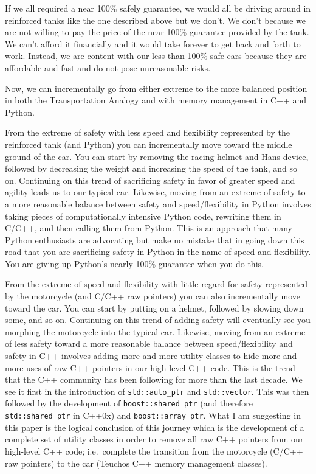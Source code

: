\documentclass[pdf,ps2pdf,11pt]{SANDreport}
\begin{document}
If we all required a near 100\% safely guarantee, we would all be
driving around in reinforced tanks like the one described above but we
don't.  We don't because we are not willing to pay the price of the
near 100\% guarantee provided by the tank.  We can't afford it
financially and it would take forever to get back and forth to
work. Instead, we are content with our less than 100\% safe cars
because they are affordable and fast and do not pose unreasonable
risks.

Now, we can incrementally go from either extreme to the more balanced
position in both the Transportation Analogy and with memory management
in C++ and Python.

From the extreme of safety with less speed and flexibility represented
by the reinforced tank (and Python) you can incrementally move toward
the middle ground of the car. You can start by removing the racing
helmet and Hans device, followed by decreasing the weight and
increasing the speed of the tank, and so on.  Continuing on this trend
of sacrificing safety in favor of greater speed and agility leads us
to our typical car.  Likewise, moving from an extreme of safety to a
more reasonable balance between safety and speed/flexibility in Python
involves taking pieces of computationally intensive Python code,
rewriting them in C/C++, and then calling them from Python.  This is
an approach that many Python enthusiasts are advocating
{}\cite{PythonForSCPerforamnce08} but make no mistake that in going
down this road that you are sacrificing safety in Python in the name
of speed and flexibility.  You are giving up Python's nearly 100\%
guarantee when you do this.

From the extreme of speed and flexibility with little regard for
safety represented by the motorcycle (and C/C++ raw pointers) you can
also incrementally move toward the car.  You can start by putting on a
helmet, followed by slowing down some, and so on.  Continuing on this
trend of adding safety will eventually see you morphing the motorcycle
into the typical car.  Likewise, moving from an extreme of less safety
toward a more reasonable balance between speed/flexibility and safety
in C++ involves adding more and more utility classes to hide more and
more uses of raw C++ pointers in our high-level C++ code.  This is the
trend that the C++ community has been following for more than the last
decade.  We see it first in the introduction of
{}\texttt{std::auto\_ptr} and {}\texttt{std::vector}.  This was then
followed by the development of {}\texttt{boost::shared\_ptr} (and
therefore {}\texttt{std::shared\_ptr} in C++0x) and
{}\texttt{boost::array\_ptr}.  What I am suggesting in this paper is
the logical conclusion of this journey which is the development of a
complete set of utility classes in order to remove all raw C++
pointers from our high-level C++ code; i.e.\ complete the transition
from the motorcycle (C/C++ raw pointers) to the car (Teuchos C++
memory management classes).
\end{document}
